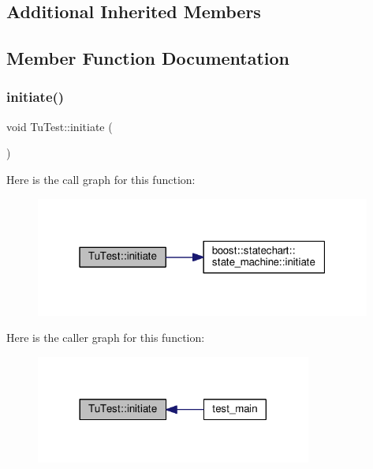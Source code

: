 \subsection*{Additional Inherited Members}


\subsection{Member Function Documentation}
\mbox{\label{struct_tu_test_a9f447a6fee2142e3b1a064c9f6d64c17}} 
\subsubsection{\texorpdfstring{initiate()}{initiate()}}
{\footnotesize\ttfamily void Tu\+Test\+::initiate (\begin{DoxyParamCaption}{ }\end{DoxyParamCaption})}

Here is the call graph for this function\+:
\nopagebreak
\begin{figure}[H]
\begin{center}
\leavevmode
\includegraphics[width=313pt]{struct_tu_test_a9f447a6fee2142e3b1a064c9f6d64c17_cgraph}
\end{center}
\end{figure}
Here is the caller graph for this function\+:
\nopagebreak
\begin{figure}[H]
\begin{center}
\leavevmode
\includegraphics[width=257pt]{struct_tu_test_a9f447a6fee2142e3b1a064c9f6d64c17_icgraph}
\end{center}
\end{figure}
\mbox{\label{struct_tu_test_a9d6f2c7c34d5698076897b2ebcb1d1f4}} 
